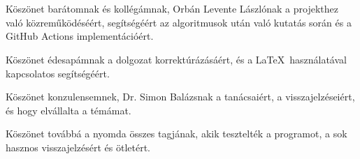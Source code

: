 \chapter*{\koszonetnyilvanitas}

Köszönet barátomnak és kollégámnak, Orbán Levente Lászlónak a projekthez való közreműködéséért, segítségéért az algoritmusok után való kutatás során és a GitHub Actions implementációért.

Köszönet édesapámnak a dolgozat korrektúrázásáért, és a \LaTeX\, használatával kapcsolatos segítségéért.

Köszönet konzulensemnek, Dr. Simon Balázsnak a tanácsaiért, a visszajelzéseiért, és hogy elvállalta a témámat.

Köszönet továbbá a nyomda összes tagjának, akik tesztelték a programot, a sok hasznos visszajelzésért és ötletért.